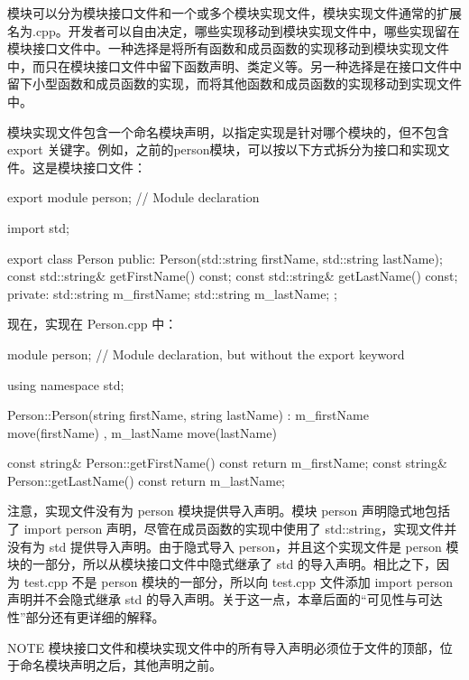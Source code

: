 
模块可以分为模块接口文件和一个或多个模块实现文件，模块实现文件通常的扩展名为.cpp。开发者可以自由决定，哪些实现移动到模块实现文件中，哪些实现留在模块接口文件中。一种选择是将所有函数和成员函数的实现移动到模块实现文件中，而只在模块接口文件中留下函数声明、类定义等。另一种选择是在接口文件中留下小型函数和成员函数的实现，而将其他函数和成员函数的实现移动到实现文件中。

模块实现文件包含一个命名模块声明，以指定实现是针对哪个模块的，但不包含 export 关键字。例如，之前的person模块，可以按以下方式拆分为接口和实现文件。这是模块接口文件：

\begin{cpp}
export module person; // Module declaration

import std;

export class Person
{
    public:
        Person(std::string firstName, std::string lastName);
        const std::string& getFirstName() const;
        const std::string& getLastName() const;
    private:
        std::string m_firstName;
        std::string m_lastName;
};
\end{cpp}

现在，实现在 Person.cpp 中：

\begin{cpp}
module person; // Module declaration, but without the export keyword

using namespace std;

Person::Person(string firstName, string lastName)
: m_firstName { move(firstName) }, m_lastName { move(lastName) }
{}

const string& Person::getFirstName() const { return m_firstName; }
const string& Person::getLastName() const { return m_lastName; }
\end{cpp}

注意，实现文件没有为 person 模块提供导入声明。模块 person 声明隐式地包括了 import person 声明，尽管在成员函数的实现中使用了 std::string，实现文件并没有为 std 提供导入声明。由于隐式导入 person，并且这个实现文件是 person 模块的一部分，所以从模块接口文件中隐式继承了 std 的导入声明。相比之下，因为 test.cpp 不是 person 模块的一部分，所以向 test.cpp 文件添加 import person 声明并不会隐式继承 std 的导入声明。关于这一点，本章后面的“可见性与可达性”部分还有更详细的解释。

\begin{myNotic}{NOTE}
模块接口文件和模块实现文件中的所有导入声明必须位于文件的顶部，位于命名模块声明之后，其他声明之前。
\end{myNotic}

